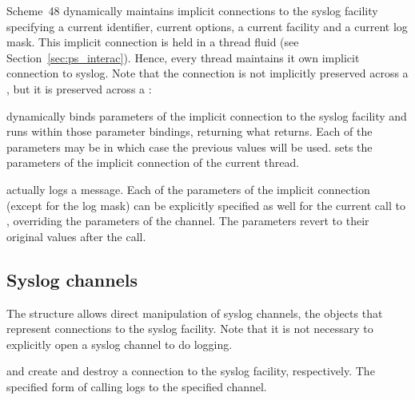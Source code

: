 Scheme~48 dynamically maintains implicit connections to the syslog
facility specifying a current identifier, current options, a current
facility and a current log mask.  This implicit connection is held in
a thread fluid (see
Section~\ref{sec:ps_interac}).  Hence, every thread
maintains it own implicit connection to syslog.  Note that the
connection is not implicitly preserved across a , but it
is preserved across a :


%
\begin{desc}
   dynamically binds parameters of the
  implicit connection to the syslog facility and runs 
  within those parameter bindings, returning what 
  returns.  Each of the parameters may be  in which case the
  previous values will be used.   sets the
  parameters of the implicit connection of the current thread.
\end{desc}

%
\begin{desc}
   actually logs a message.  Each of the parameters of the
  implicit connection (except for the log mask) can be explicitly
  specified as well for the current call to , overriding
  the parameters of the channel.  The parameters revert to their
  original values after the call.
\end{desc}

\subsection*{Syslog channels}
%
The  structure allows direct manipulation of
syslog channels, the objects that represent connections to the syslog
facility.  Note that it is
not necessary to explicitly open a syslog channel to do logging.

%
\begin{desc}
   and  create and
  destroy a connection to the syslog facility, respectively.  The
  specified form of calling  logs to the specified channel.
\end{desc}


